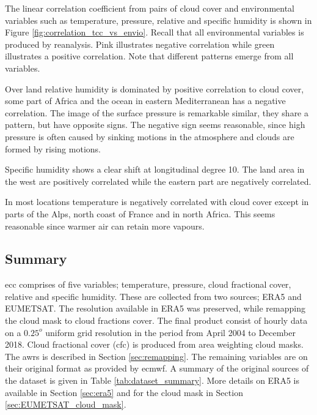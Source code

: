 The linear correlation coefficient from pairs of cloud cover and environmental variables such as temperature, pressure, relative and specific humidity is shown in Figure \ref{fig:correlation_tcc_vs_envio}. Recall that all environmental variables is produced by reanalysis. Pink illustrates negative correlation while green illustrates a positive correlation. Note that different patterns emerge from all variables. %

Over land relative humidity is dominated by positive correlation to cloud cover, some part of Africa and the ocean in eastern Mediterranean has a negative correlation. The image of the surface pressure is remarkable similar, they share a pattern, but have opposite signs. The negative sign seems reasonable, since high pressure is often caused by sinking motions in the atmosphere and clouds are formed by rising motions. 

Specific humidity shows a clear shift at longitudinal degree 10. The land area in the west are positively correlated while the eastern part are  negatively correlated. 

In most locations temperature is negatively correlated with cloud cover except in parts of the Alps, north coast of France and in north Africa. This seems reasonable since warmer air can retain more vapours.%

\subsection{Summary}
\acrshort{ecc} comprises of five variables; temperature, pressure, cloud fractional cover, relative and specific humidity. These are collected from two sources; ERA5 and EUMETSAT. The resolution available in ERA5 was preserved, while remapping the cloud mask to cloud fractions cover. 
The final product consist of %
hourly data on a $0.25^o$ uniform grid resolution in the period from April 2004 to December 2018. Cloud fractional cover (\acrshort{cfc}) is produced from area weighting cloud masks. The \acrshort{awrs} is described in Section \ref{sec:remapping}. The remaining variables are on their original format as provided by \acrfull{ecmwf}. A summary of the original sources of the dataset is given in Table \ref{tab:dataset_summary}. More details on ERA5 is available in Section \ref{sec:era5} and for the cloud mask in Section \ref{sec:EUMETSAT_cloud_mask}. 
